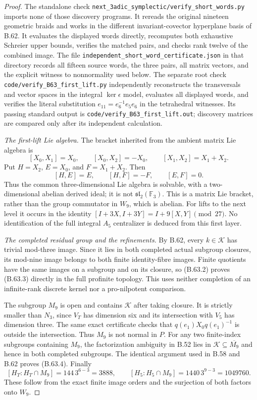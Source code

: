 \begin{proof}
The standalone check
\nolinkurl{next_3adic_symplectic/verify_short_words.py}
imports none of those discovery programs.
It rereads the original nineteen geometric braids and
works in the different invariant-covector hyperplane
basis of B.62.
It evaluates the displayed words directly, recomputes
both exhaustive Schreier upper bounds, verifies the
matched pairs, and checks rank twelve of the combined
image.  The file
\nolinkurl{independent_short_word_certificate.json}
in that directory records all fifteen source words,
the three pairs, all matrix vectors, and the explicit
witness to nonnormality used below.
The separate root check
\nolinkurl{code/verify_B63_first_lift.py}
independently reconstructs the transversals and vector
spaces in the integral $\ker\epsilon$ model, evaluates
all displayed words, and verifies the literal substitution
$e_{11}=e_6^{-1}e_5e_6$ in the tetrahedral witnesses.
Its passing standard output is
\nolinkurl{code/verify_B63_first_lift.out}; discovery
matrices are compared only after its independent calculation.

\emph{The first-lift Lie algebra.}
The bracket inherited from the ambient matrix Lie
algebra is
\[
 [X_0,X_1]=X_0,\qquad
 [X_0,X_2]=-X_0,\qquad
 [X_1,X_2]=X_1+X_2.                                        \tag{B.63.10}
\]
Put $H=X_2$, $E=X_0$, and $F=X_1+X_2$.
Then
\[
                 [H,E]=E,\qquad [H,F]=-F,\qquad [E,F]=0.
                                                               \tag{B.63.11}
\]
Thus the common three-dimensional Lie algebra is
solvable, with a two-dimensional abelian derived ideal;
it is not $\mathfrak{sl}_2(\mathbb F_3)$.
This is a matrix Lie bracket, rather than the group
commutator in $W_9$, which is abelian.
For lifts to the next level it occurs in the identity
$[I+3X,I+3Y]=I+9[X,Y]\pmod {27}$.
No identification of the full integral $A_5$ centralizer
is deduced from this first layer.

\emph{The completed residual group and the refinements.}
By B.62, every $k\in\mathcal K$ has trivial mod-three
image.  Since it lies in both completed actual subgroup
closures, its mod-nine image belongs to both finite
identity-fibre images.  Finite quotients have the same
images on a subgroup and on its closure, so (B.63.2)
proves (B.63.3) directly in the full profinite topology.
This uses neither completion of an infinite-rank
discrete kernel nor a pro-nilpotent comparison.

The subgroup $M_9$ is open and contains $\mathcal K$
after taking closure.  It is strictly smaller than
$N_3$, since $V_T$ has dimension six and its intersection
with $V_5$ has dimension three.
The same exact certificate checks that
$q(e_1)X_0q(e_1)^{-1}$ is outside the intersection.
Thus $M_9$ is not normal in $P$.
For any two finite-index subgroups containing $M_9$,
the factorization ambiguity in B.52 lies in
$\mathcal K\subseteq\overline{M_9}$ and hence in both
completed subgroups.  The identical argument used in
B.58 and B.62 proves (B.63.4).
Finally
\[
 [H_T:H_T\cap M_9]=144\,3^{6-3}=3888,
 \qquad
 [H_5:H_5\cap M_9]=1440\,3^{9-3}=1049760.
\]
These follow from the exact finite image orders and the
surjection of both factors onto $W_9$.


\end{proof}
